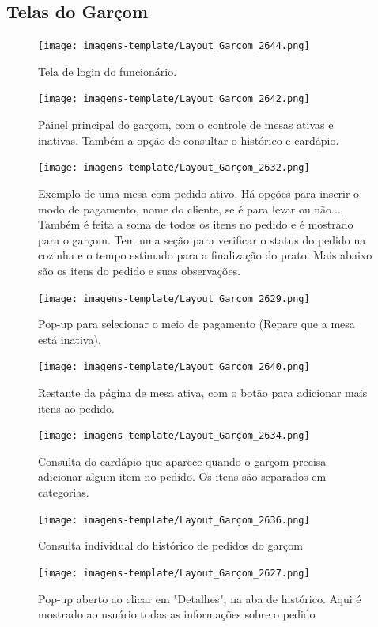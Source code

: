 \newpage
\begin{center}
    \subsection{Telas do Garçom}
    \begin{figure}[!htp]
    \texttt{[image: imagens-template/Layout\_Garçom\_2644.png]} 
        \caption{Tela de login do funcionário.}
    \end{figure}
    \newpage
    \begin{figure}[!htp]
    \texttt{[image: imagens-template/Layout\_Garçom\_2642.png]} 
        \caption{Painel principal do garçom, com o controle de mesas ativas e inativas. Também a opção de consultar o histórico e cardápio.}
    \end{figure}
    \newpage
    \begin{figure}[!htp]
    \texttt{[image: imagens-template/Layout\_Garçom\_2632.png]} 
        \caption{Exemplo de uma mesa com pedido ativo. Há opções para inserir o modo de pagamento, nome do cliente, se é para levar ou não... Também é feita a soma de todos os itens no pedido e é mostrado para o garçom. Tem uma seção para verificar o status do pedido na cozinha e o tempo estimado para a finalização do prato. Mais abaixo são os itens do pedido e suas observações.}
    \end{figure}
    \newpage
    \begin{figure}[!htp]
    \texttt{[image: imagens-template/Layout\_Garçom\_2629.png]} 
        \caption{Pop-up para selecionar o meio de pagamento (Repare que a mesa está inativa).}
    \end{figure}
    \newpage
    \begin{figure}[!htp]
    \texttt{[image: imagens-template/Layout\_Garçom\_2640.png]} 
        \caption{Restante da página de mesa ativa, com o botão para adicionar mais itens ao pedido.}
    \end{figure}
    \newpage
    \begin{figure}[!htp]
    \texttt{[image: imagens-template/Layout\_Garçom\_2634.png]} 
        \caption{Consulta do cardápio que aparece quando o garçom precisa adicionar algum item no pedido. Os itens são separados em categorias.}
    \end{figure}
    \newpage
    \begin{figure}[!htp]
    \texttt{[image: imagens-template/Layout\_Garçom\_2636.png]} 
        \caption{Consulta individual do histórico de pedidos do garçom}
    \end{figure}
    \newpage
    \begin{figure}[!htp]
    \texttt{[image: imagens-template/Layout\_Garçom\_2627.png]} 
        \caption{Pop-up aberto ao clicar em "Detalhes", na aba de histórico. Aqui é mostrado ao usuário todas as informações sobre o pedido}
    \end{figure}
    \newpage
\end{center}

